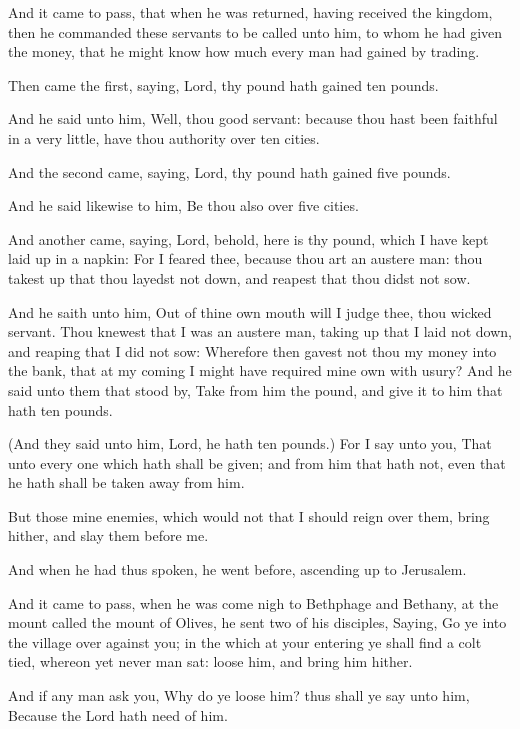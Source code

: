 \verse And it came to pass, that when he was returned, having received the kingdom, then he commanded these servants to be called unto him, to whom he had given the money, that he might know how much every man had gained by trading.

\verse Then came the first, saying, Lord, thy pound hath gained ten pounds.

\verse And he said unto him, Well, thou good servant: because thou hast been faithful in a very little, have thou authority over ten cities.

\verse And the second came, saying, Lord, thy pound hath gained five pounds.

\verse And he said likewise to him, Be thou also over five cities.

\verse And another came, saying, Lord, behold, here is thy pound, which I have kept laid up in a napkin: \verse For I feared thee, because thou art an austere man: thou takest up that thou layedst not down, and reapest that thou didst not sow.

\verse And he saith unto him, Out of thine own mouth will I judge thee, thou wicked servant. Thou knewest that I was an austere man, taking up that I laid not down, and reaping that I did not sow: \verse Wherefore then gavest not thou my money into the bank, that at my coming I might have required mine own with usury?  \verse And he said unto them that stood by, Take from him the pound, and give it to him that hath ten pounds.

\verse (And they said unto him, Lord, he hath ten pounds.)  \verse For I say unto you, That unto every one which hath shall be given; and from him that hath not, even that he hath shall be taken away from him.

\verse But those mine enemies, which would not that I should reign over them, bring hither, and slay them before me.

\verse And when he had thus spoken, he went before, ascending up to Jerusalem.

\verse And it came to pass, when he was come nigh to Bethphage and Bethany, at the mount called the mount of Olives, he sent two of his disciples, \verse Saying, Go ye into the village over against you; in the which at your entering ye shall find a colt tied, whereon yet never man sat: loose him, and bring him hither.

\verse And if any man ask you, Why do ye loose him? thus shall ye say unto him, Because the Lord hath need of him.

